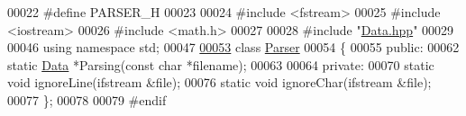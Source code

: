 \begin{DoxyCode}
00022 \textcolor{preprocessor}{}\textcolor{preprocessor}{#define PARSER\_H}
00023 \textcolor{preprocessor}{}
00024 \textcolor{preprocessor}{#include <fstream>}
00025 \textcolor{preprocessor}{#include <iostream>}
00026 \textcolor{preprocessor}{#include <math.h>}
00027 
00028 \textcolor{preprocessor}{#include "\hyperlink{Data_8hpp}{Data.hpp}"}
00029 
00046 \textcolor{keyword}{using namespace }std;
00047 
\hypertarget{Parser_8hpp_source_l00053}{}\hyperlink{classParser}{00053} \textcolor{keyword}{class }\hyperlink{classParser}{Parser}
00054 \{
00055 \textcolor{keyword}{public}:
00062     \textcolor{keyword}{static} \hyperlink{classData}{Data} *Parsing(\textcolor{keyword}{const} \textcolor{keywordtype}{char} *filename);
00063     
00064 \textcolor{keyword}{private}:
00070     \textcolor{keyword}{static} \textcolor{keywordtype}{void} ignoreLine(ifstream &file);
00076     \textcolor{keyword}{static} \textcolor{keywordtype}{void} ignoreChar(ifstream &file);
00077 \};
00078 
00079 \textcolor{preprocessor}{#endif}
\end{DoxyCode}

